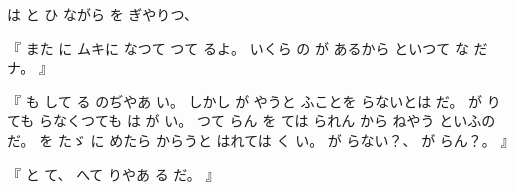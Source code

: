 
%
は
と
ひ
ながら
を
ぎやりつ、

%
『
また
に
ムキに
なつて
つて%
るよ。
%
いくら
の
が
あるから
といつて
な
だナ。
』

%
『
も
して
る
のぢやあ
い。
%
しかし
が
やうと
ふことを
らないとは
だ。
%
が
りても
らなくつても
は
が
い。
%
つて
らん
を
ては
られん
から
ねやう
といふのだ。
%
を
たゞ%
に
めたら
からうと
はれては
く
い。
%
が
らない？、
%
が
らん？。
』

%
『
と
て、
%
へて
りやあ
る
だ。
』

